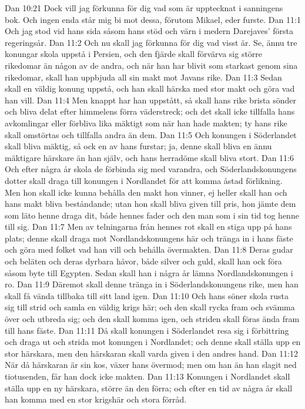 Dan 10:21  Dock vill jag förkunna för dig vad som är upptecknat i sanningens bok. Och ingen enda står mig bi mot dessa, förutom Mikael, eder furste.
Dan 11:1  Och jag stod vid hans sida såsom hans stöd och värn i medern Darejaves' första regeringsår.
Dan 11:2  Och nu skall jag förkunna för dig vad visst är. Se, ännu tre konungar skola uppstå i Persien, och den fjärde skall förvärva sig större rikedomar än någon av de andra, och när han har blivit som starkast genom sina rikedomar, skall han uppbjuda all sin makt mot Javans rike.
Dan 11:3  Sedan skall en väldig konung uppstå, och han skall härska med stor makt och göra vad han vill.
Dan 11:4  Men knappt har han uppstått, så skall hans rike brista sönder och bliva delat efter himmelens förra väderstreck; och det skall icke tillfalla hans avkomlingar eller förbliva lika mäktigt som när han hade makten; ty hans rike skall omstörtas och tillfalla andra än dem.
Dan 11:5  Och konungen i Söderlandet skall bliva mäktig, så ock en av hans furstar; ja, denne skall bliva en ännu mäktigare härskare än han själv, och hans herradöme skall bliva stort.
Dan 11:6  Och efter några år skola de förbinda sig med varandra, och Söderlandskonungens dotter skall draga till konungen i Nordlandet för att komma åstad förlikning. Men hon skall icke kunna behålla den makt hon vinner, ej heller skall han och hans makt bliva beståndande; utan hon skall bliva given till pris, hon jämte dem som läto henne draga dit, både hennes fader och den man som i sin tid tog henne till sig.
Dan 11:7  Men av telningarna från hennes rot skall en stiga upp på hans plats; denne skall draga mot Nordlandskonungens här och tränga in i hans fäste och göra med folket vad han vill och behålla övermakten.
Dan 11:8  Deras gudar och beläten och deras dyrbara håvor, både silver och guld, skall han ock föra såsom byte till Egypten. Sedan skall han i några år lämna Nordlandskonungen i ro.
Dan 11:9  Däremot skall denne tränga in i Söderlandskonungens rike, men han skall få vända tillbaka till sitt land igen.
Dan 11:10  Och hans söner skola rusta sig till strid och samla en väldig krigs här; och den skall rycka fram och svämma över och utbreda sig; och den skall komma igen, och striden skall föras ända fram till hans fäste.
Dan 11:11  Då skall konungen i Söderlandet resa sig i förbittring och draga ut och strida mot konungen i Nordlandet; och denne skall ställa upp en stor härskara, men den härskaran skall varda given i den andres hand.
Dan 11:12  När då härskaran är sin kos, växer hans övermod; men om han än han slagit ned tiotusenden, får han dock icke makten.
Dan 11:13  Konungen i Nordlandet skall ställa upp en ny härskara, större än den förra; och efter en tid av några år skall han komma med en stor krigshär och stora förråd.
